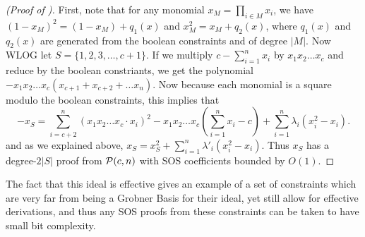 \begin{proof}[(Proof of )]
First, note that for any monomial $x_M = \prod_{i \in M} x_i$, we have $(1-x_M)^2 = (1-x_M) + q_1(x)$ and $x_M^2 = x_M + q_2(x)$, where $q_1(x)$ and $q_2(x)$ are generated from the boolean constraints and of degree $|M|$. Now WLOG let $S = \{1,2,3,\dots,c+1\}$. If we multiply $c - \sum_{i=1}^n x_i$ by $x_1x_2\dots x_c$ and reduce by the boolean constriants, we get the polynomial $-x_1x_2\dots x_c(x_{c+1} + x_{c+2} + \dots x_n)$. Now because each monomial is a square modulo the boolean constraints, this implies that 
\[-x_S = \sum_{i = c+2}^n (x_1x_2\dots x_c \cdot x_i)^2 - x_1x_2\dots x_c(\sum_{i=1}^n x_i - c) + \sum_{i=1}^n \lambda_i(x_i^2 - x_i).\]
and as we explained above, $x_S = x_S^2 + \sum_{i=1}^n \lambda'_i(x_i^2 - x_i)$. Thus $x_S$ has a degree-$2|S|$ proof from $\mathcal P(c,n)$ with SOS coefficients bounded by $O(1)$.
\end{proof}

The fact that this ideal is effective gives an example of a set of constraints which are very far from being a Grobner Basis for their ideal, yet still allow for effective derivations, and thus any SOS proofs from these constraints can be taken to have small bit complexity. 


